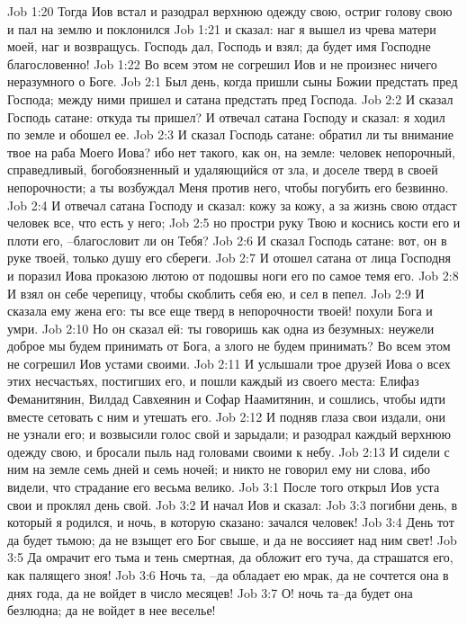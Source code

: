 Job 1:20  Тогда Иов встал и разодрал верхнюю одежду свою, остриг голову свою и пал на землю и поклонился
Job 1:21  и сказал: наг я вышел из чрева матери моей, наг и возвращусь. Господь дал, Господь и взял; да будет имя Господне благословенно!
Job 1:22  Во всем этом не согрешил Иов и не произнес ничего неразумного о Боге.
Job 2:1  Был день, когда пришли сыны Божии предстать пред Господа; между ними пришел и сатана предстать пред Господа.
Job 2:2  И сказал Господь сатане: откуда ты пришел? И отвечал сатана Господу и сказал: я ходил по земле и обошел ее.
Job 2:3  И сказал Господь сатане: обратил ли ты внимание твое на раба Моего Иова? ибо нет такого, как он, на земле: человек непорочный, справедливый, богобоязненный и удаляющийся от зла, и доселе тверд в своей непорочности; а ты возбуждал Меня против него, чтобы погубить его безвинно.
Job 2:4  И отвечал сатана Господу и сказал: кожу за кожу, а за жизнь свою отдаст человек все, что есть у него;
Job 2:5  но простри руку Твою и коснись кости его и плоти его, --благословит ли он Тебя?
Job 2:6  И сказал Господь сатане: вот, он в руке твоей, только душу его сбереги.
Job 2:7  И отошел сатана от лица Господня и поразил Иова проказою лютою от подошвы ноги его по самое темя его.
Job 2:8  И взял он себе черепицу, чтобы скоблить себя ею, и сел в пепел.
Job 2:9  И сказала ему жена его: ты все еще тверд в непорочности твоей! похули Бога и умри.
Job 2:10  Но он сказал ей: ты говоришь как одна из безумных: неужели доброе мы будем принимать от Бога, а злого не будем принимать? Во всем этом не согрешил Иов устами своими.
Job 2:11  И услышали трое друзей Иова о всех этих несчастьях, постигших его, и пошли каждый из своего места: Елифаз Феманитянин, Вилдад Савхеянин и Софар Наамитянин, и сошлись, чтобы идти вместе сетовать с ним и утешать его.
Job 2:12  И подняв глаза свои издали, они не узнали его; и возвысили голос свой и зарыдали; и разодрал каждый верхнюю одежду свою, и бросали пыль над головами своими к небу.
Job 2:13  И сидели с ним на земле семь дней и семь ночей; и никто не говорил ему ни слова, ибо видели, что страдание его весьма велико.
Job 3:1  После того открыл Иов уста свои и проклял день свой.
Job 3:2  И начал Иов и сказал:
Job 3:3  погибни день, в который я родился, и ночь, в которую сказано: зачался человек!
Job 3:4  День тот да будет тьмою; да не взыщет его Бог свыше, и да не воссияет над ним свет!
Job 3:5  Да омрачит его тьма и тень смертная, да обложит его туча, да страшатся его, как палящего зноя!
Job 3:6  Ночь та, --да обладает ею мрак, да не сочтется она в днях года, да не войдет в число месяцев!
Job 3:7  О! ночь та--да будет она безлюдна; да не войдет в нее веселье!
